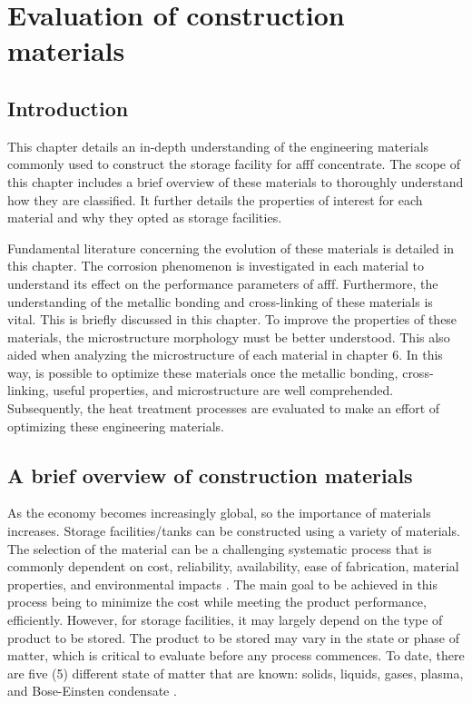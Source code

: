 \chapter{Evaluation of construction materials}
\section{Introduction}
This chapter details an in-depth understanding of the engineering materials commonly used to construct the storage facility for \acrshort{afff} concentrate. The scope of this chapter includes a brief overview of these materials to thoroughly understand how they are classified. It further details the properties of interest for each material and why they opted as storage facilities.

Fundamental literature concerning the evolution of these materials is detailed in this chapter. The corrosion phenomenon is investigated in each material to understand its effect on the performance parameters of \acrshort{afff}. Furthermore, the understanding of the metallic bonding and cross-linking of these materials is vital. This is briefly discussed in this chapter. To improve the properties of these materials, the microstructure morphology must be better understood. This also aided when analyzing the microstructure of each material in chapter 6. In this way, is possible to optimize these materials once the metallic bonding, cross-linking, useful properties, and microstructure are well comprehended. Subsequently, the heat treatment processes are evaluated to make an effort of optimizing these engineering materials.

\section{A brief overview of construction materials}
As the economy becomes increasingly global, so the importance of materials increases. Storage facilities/tanks can be constructed using a variety of materials. The selection of the material can be a challenging systematic process that is commonly dependent on cost, reliability, availability, ease of fabrication, material properties, and environmental impacts \cite{hench2005biomaterials}.  The main goal to be achieved in this process being to minimize the cost while meeting the product performance, efficiently. However, for storage facilities, it may largely depend on the type of product to be stored. The product to be stored may vary in the state or phase of matter, which is critical to evaluate before any process commences. To date, there are five (5) different state of matter that are known: solids, liquids, gases, plasma, and Bose-Einsten condensate \cite{ceruti2002states}. 


